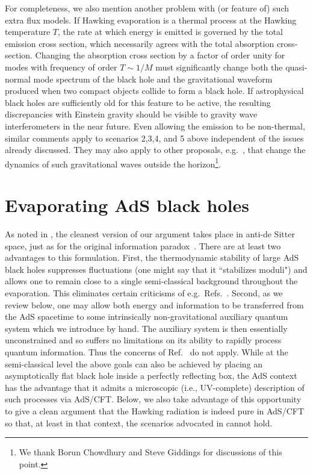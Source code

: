 \documentclass[12pt]{article}
\newcommand{\sect}[1]{\section{#1}\setcounter{equation}{0}}
\begin{document}
For completeness, we also mention another problem with (or feature of) such extra flux models.  If Hawking evaporation is a thermal process at the Hawking temperature $T$, the rate at which energy is emitted is governed by the total emission cross section, which necessarily agrees with the total absorption cross-section.  Changing the absorption cross section by a factor of order unity for modes with frequency of order $T \sim 1/M$ must significantly change both the quasi-normal mode spectrum of the black hole and the gravitational waveform produced when two compact objects collide to form a black hole. {If astrophysical black holes are sufficiently old for this feature to be active,  the} resulting discrepancies with Einstein gravity should be visible to gravity wave interferometers in the near future.  Even allowing the emission to be non-thermal, similar comments apply to scenarios 2,3,4, and 5 above independent of the issues already discussed.  They may also apply to other proposals, e.g.\ \cite{Avery:2012tf}, that change the dynamics of such gravitational waves outside the horizon\footnote{We thank Borun Chowdhury and Steve Giddings for discussions of this point.}.


\sect{Evaporating AdS black holes}

\label{inAdS}

As noted in \cite{Almheiri:2012rt}, the cleanest version of our argument takes place in anti-de Sitter space, just as for the original information paradox~\cite{Maldacena:2001kr}.
There are at least two advantages to this formulation.  First, the thermodynamic stability of large AdS black holes suppresses fluctuations (one might say that it ``stabilizes moduli") and allows one to remain close to a single semi-classical background throughout the evaporation.  This eliminates certain criticisms of e.g.\ Refs.~\cite{Nomura2,Hsu}.  Second, as we review below, one may allow both energy and information to be transferred from the AdS spacetime to some intrinsically non-gravitational auxiliary quantum system which we introduce by hand.  The auxiliary system is then essentially unconstrained and so suffers no limitations on its ability to rapidly process quantum information.  Thus the concerns of Ref.~\cite{Harlow:2013tf} do not apply. While at the semi-classical level the above goals can also be achieved by placing an asymptotically flat black hole inside a perfectly reflecting box, the AdS context has the advantage that it admits a microscopic (i.e., UV-complete) description of such processes via AdS/CFT.  Below, we also take advantage of this opportunity to give a clean argument that the Hawking radiation is indeed pure in AdS/CFT so that, at least in that context, the scenarios advocated in \cite{Hossenfelder:2012mr,Jacobson:2012gh} cannot hold.
\end{document}
